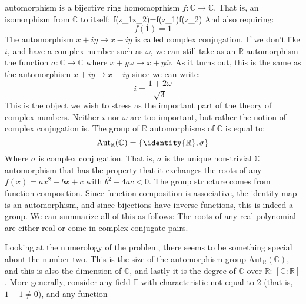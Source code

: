     automorphism is a bijective ring homomoprhism
    $f:\mathbb{C}\rightarrow\mathbb{C}$. That is, an isomorphism from
    $\mathbb{C}$ to itself:
                      {f(z_{1}z_{2})=f(z_{1})f(z_{2})}
    And also requiring:
    \begin{equation}
            f(1)=1
    \end{equation}
    The automorphism $x+iy\mapsto{x}-iy$ is called complex conjugation.
    If we don't like $i$, and have a complex number such as $\omega$,
    we can still take as an $\mathbb{R}$ automorphism the function
    $\sigma:\mathbb{C}\rightarrow\mathbb{C}$ where
    $x+y\omega\mapsto{x}+y\overline{\omega}$. As it turns out, this is
    the same as the automorphism $x+iy\mapsto{x}-iy$ since we can write:
    \begin{equation}
        i=\frac{1+2\omega}{\sqrt{3}}
    \end{equation}
    This is the object we wish to stress as the important part of the
    theory of complex numbers. Neither $i$ nor $\omega$ are too
    important, but rather the notion of complex conjugation is.
    The group of $\mathbb{R}$ automorphisms of $\mathbb{C}$ is equal to:
    \begin{equation}
        \textrm{Aut}_{\mathbb{R}}(\mathbb{C})
            =\{\identity{\mathbb{R}},\sigma\}
    \end{equation}
    Where $\sigma$ is complex conjugation. That is, $\sigma$ is the
    unique non-trivial $\mathbb{C}$ automorphism that has the property
    that it exchanges the roots of any $f(x)=ax^{2}+bx+c$ with
    $b^{2}-4ac<0$. The group structure comes from function composition.
    Since function composition is associative, the identity map is an
    automorphism, and since bijections have inverse functions,
    this is indeed a group. We can summarize all of this as follows:
    The roots of any real polynomial are either real or come in complex
    conjugate pairs.
    \par\hfill\par
    Looking at the numerology of the problem, there seems to be
    something special about the number two. This is the size of the
    automorphism group $\textrm{Aut}_{\mathbb{R}}(\mathbb{C})$, and
    this is also the dimension of $\mathbb{C}$, and lastly it is the
    degree of $\mathbb{C}$ over $\mathbb{R}$: $[\mathbb{C}:\mathbb{R}]$.
    More generally, consider any field $\mathbb{F}$ with characteristic
    not equal to 2 (that is, $1+1\ne{0}$), and any function

